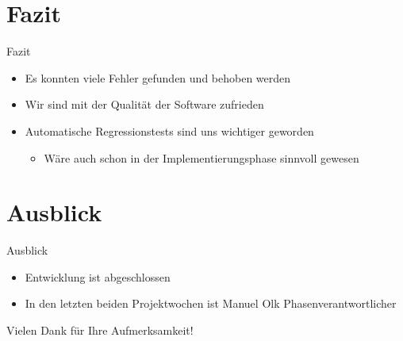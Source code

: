 \documentclass[18pt]{beamer}
\begin{document}
\section{Fazit}
\begin{frame}{Fazit}
\begin{itemize}
	\item Es konnten viele Fehler gefunden und behoben werden
	\item Wir sind mit der Qualität der Software zufrieden
	\item Automatische Regressionstests sind uns wichtiger geworden
	\begin{itemize}
		\item Wäre auch schon in der Implementierungsphase sinnvoll gewesen
	\end{itemize}
	
\end{itemize}
\end{frame}

\section{Ausblick}
\begin{frame}{Ausblick}
\begin{itemize}
	\item Entwicklung ist abgeschlossen
	\item In den letzten beiden Projektwochen ist Manuel Olk Phasenverantwortlicher
\end{itemize}
\end{frame}


\appendix

\begin{frame}{}

\begin{LARGE}
\begin{center}
	Vielen Dank für Ihre Aufmerksamkeit!
\end{center}
\end{LARGE}
\end{frame}
\end{document}
